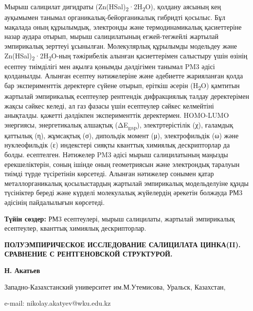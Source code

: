 Мырыш салицилат дигидраты
(Zn(HSal)\textsubscript{2}·2H\textsubscript{2}O), қолдану аясының кең
ауқымымен танымал органикалық-бейорганикалық гибридті қосылыс. Бұл
мақалада оның құрылымдық, электронды және термодинамикалық қасиеттеріне
назар аудара отырып, мырыш салицилатының егжей-тегжейлі жартылай
эмпирикалық зерттеуі ұсынылған. Молекулярлық құрылымды модельдеу және
Zn(HSal)\textsubscript{2}·2H\textsubscript{2}O-ның тәжірибелік алынған
қасиеттерімен салыстыру үшін өзінің есептеу тиімділігі мен ақылға
қонымды дәлдігімен танымал PM3 әдісі қолданылды. Алынған есептеу
нәтижелеріне және әдебиетте жарияланған қолда бар эксперименттік
деректерге сүйене отырып, еріткіш әсерін (H\textsubscript{2}O) қамтитын
жартылай эмпирикалық есептеулер рентгендік дифракциялық талдау
деректерімен жақсы сәйкес келеді, ал газ фазасы үшін есептеулер сәйкес
келмейтіні анықталды. қажетті дәлдікпен эксперименттік деректермен.
HOMO-LUMO энергиясы, энергетикалық алшақтық (ΔE\textsubscript{gap}),
электртерістілік (χ), ғаламдық қаттылық (η), жұмсақтық (σ), дипольдік
момент (μ), электрофильдік (ω) және нуклеофильдік (ε) индекстері сияқты
кванттық химиялық дескрипторлар да болды. есептелген. Нәтижелер PM3
әдісі мырыш салицилатының маңызды ерекшеліктерін, соның ішінде оның
геометриясын және электрондық таралуын тиімді түрде түсіретінін
көрсетеді. Алынған нәтижелер сонымен қатар металлорганикалық
қосылыстардың жартылай эмпирикалық модельделуіне құнды түсініктер береді
және күрделі молекулалық жүйелердің әрекетін болжауда РМ3 әдісінің
пайдалылығын көрсетеді.

{\bfseries Түйін сөздер:} РМ3 есептеулері, мырыш салицилаты, жартылай
эмпирикалық есептеулер, кванттық химиялық дескрипторлар.

\begin{center}
{\large\bfseries ПОЛУЭМПИРИЧЕСКОЕ ИССЛЕДОВАНИЕ САЛИЦИЛАТА ЦИНКА(II). СРАВНЕНИЕ С
РЕНТГЕНОВСКОЙ СТРУКТУРОЙ.}

{\bfseries Н. Акатьев}

Западно-Казахстанский университет им.М.Утемисова, Уральск, Казахстан,

e-mail: nikolay.akatyev@wku.edu.kz
\end{center}

